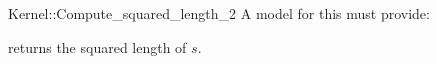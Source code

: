 \begin{ccRefFunctionObjectConcept}{Kernel::Compute_squared_length_2}
A model for this must provide:


       {returns the squared length of $s$. }

\end{ccRefFunctionObjectConcept}

